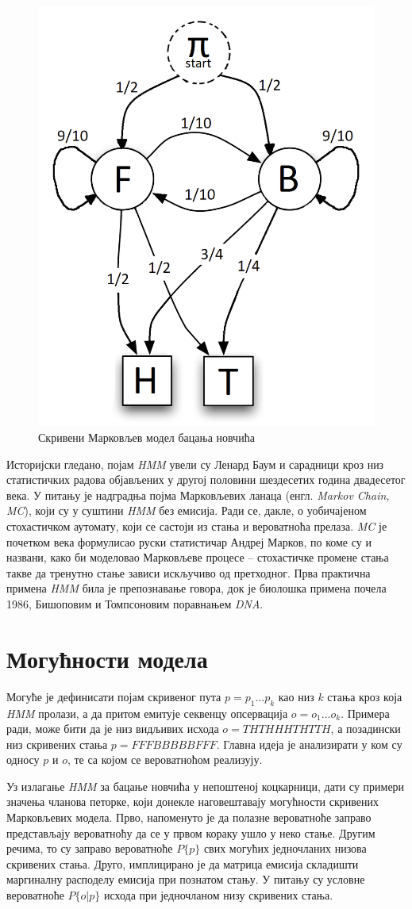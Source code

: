 \documentclass[12pt,oneside]{memoir}
\begin{document}
\begin{CJK}{UTF8}{ipxm}
\begin{figure}[!ht]
  \centering
  \includegraphics[width=.5\textwidth]{kockarnica.png}
  \caption{Скривени Марковљев модел бацања новчића}
  \label{fig:kock}
\end{figure}

Историјски гледано, појам \textit{HMM} увели су Ленард Баум и сарадници кроз низ статистичких радова објављених у другој половини шездесетих година двадесетог века\cite{baum1966}. У питању је надградња појма Марковљевих ланаца (енгл. \textit{Markov Chain, MC}), који су у суштини \textit{HMM} без емисија. Ради се, дакле, о уобичајеном стохастичком аутомату, који се састоји из стања и вероватноћа прелаза. \textit{MC} је почетком века формулисао руски статистичар Андреј Марков, по коме су и названи, како би моделовао Марковљеве процесе -- стохастичке промене стања такве да тренутно стање зависи искључиво од претходног\cite{markov1906}. Прва практична примена \textit{HMM} била је препознавање говора, док је биолошка примена почела 1986, Бишоповим и Томпсоновим поравнањем \textit{DNA}\cite{bishop1986}.

\section{Могућности модела}
Могуће је дефинисати појам скривеног пута $p = p_1...p_k$ као низ $k$ стања кроз која \textit{HMM} пролази, а да притом емитује секвенцу опсервација $o = o_1...o_k$. Примера ради, може бити да је низ видљивих исхода $o = THTHHHTHTTH$, а позадински низ скривених стања $p = FFFBBBBBFFF$. Главна идеја је анализирати у ком су односу $p$ и $o$, те са којом се вероватноћом реализују.

Уз излагање \textit{HMM} за бацање новчића у непоштеној коцкарници, дати су примери значења чланова петорке, који донекле наговештавају могућности скривених Марковљевих модела. Прво, напоменуто је да полазне вероватноће заправо представљају вероватноћу да се у првом кораку ушло у неко стање. Другим речима, то су заправо вероватноће $P\{p\}$ свих могућих једночланих низова скривених стања. Друго, имплицирано је да матрица емисија складишти маргиналну расподелу емисија при познатом стању. У питању су условне вероватноће $P\{o | p\}$ исхода при једночланом низу скривених стања.


\end{CJK}
\end{document}
